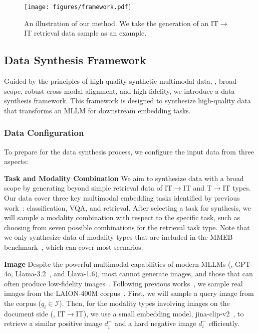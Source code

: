 \begin{figure*}[!t]
	\centering
	\texttt{[image: figures/framework.pdf]}%
	\caption{An illustration of our method. We take the generation of an IT$\rightarrow$IT retrieval data sample as an example.}
	\vspace{-2ex}
	\label{fig:framework}
\end{figure*}

\subsection{Data Synthesis Framework}

Guided by the principles of high-quality synthetic multimodal data, \ie, broad scope, robust cross-modal alignment, and high fidelity, we introduce a data synthesis framework. This framework is designed to synthesize high-quality data that transforms an MLLM for downstream embedding tasks.

\subsubsection{Data Configuration}

To prepare for the data synthesis process, we configure the input data from three aspects:

\noindent \textbf{Task and Modality Combination}
We aim to synthesize data with a broad scope by generating beyond simple retrieval data of IT$\rightarrow$IT and T$\rightarrow$IT types.
Our data cover three key multimodal embedding tasks identified by previous work~\cite{MMEB}: classification, VQA, and retrieval.
After selecting a task for synthesis, we will sample a modality combination with respect to the specific task, such as choosing from seven possible combinations for the retrieval task type.
Note that we only synthesize data of modality types that are included in the MMEB benchmark~\cite{MMEB}, which can cover most scenarios.

\noindent \textbf{Image}
Despite the powerful multimodal capabilities of modern MLLMs (\eg, GPT-4o, Llama-3.2~\cite{llama3}, and Llava-1.6), most cannot generate images, and those that can often produce low-fidelity images~\cite{VISTA}.
Following previous works~\cite{MagicLens, megapairs}, we sample real images from the LAION-400M corpus~\cite{LAION}.
First, we will sample a query image from the corpus ($q_i \in \mathcal{I}$).
Then, for the modality types involving images on the document side (\eg, IT$\rightarrow$IT), we use a small embedding model, jina-clip-v2~\cite{jina-clip}, to retrieve a similar positive image $d^+_i$ and a hard negative image $d^-_i$ efficiently.

